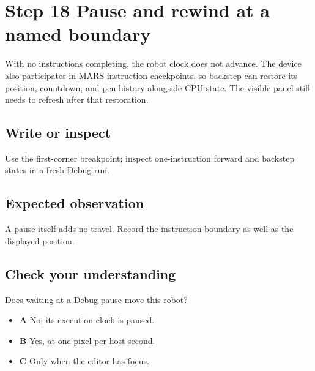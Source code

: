 \section{Step 18 Pause and rewind at a named
  boundary}\label{006-marsbot-square-s18-step-18-pause-and-rewind-at-a-named-boundary}

With no instructions completing, the robot clock does not advance. The
device also participates in MARS instruction checkpoints, so backstep
can restore its position, countdown, and pen history alongside CPU
state. The visible panel still needs to refresh after that restoration.

\subsection{Write or
  inspect}\label{006-marsbot-square-s18-write-or-inspect}

Use the first-corner breakpoint; inspect one-instruction forward and
backstep states in a fresh Debug run.

\subsection{Expected
  observation}\label{006-marsbot-square-s18-expected-observation}

A pause itself adds no travel. Record the instruction boundary as well
as the displayed position.

\subsection{Check your
  understanding}\label{006-marsbot-square-s18-check-your-understanding}

Does waiting at a Debug pause move this robot?

\begin{itemize}
  \tightlist
  \item
        \textbf{A} No; its execution clock is paused.
  \item
        \textbf{B} Yes, at one pixel per host second.
  \item
        \textbf{C} Only when the editor has focus.
\end{itemize}
